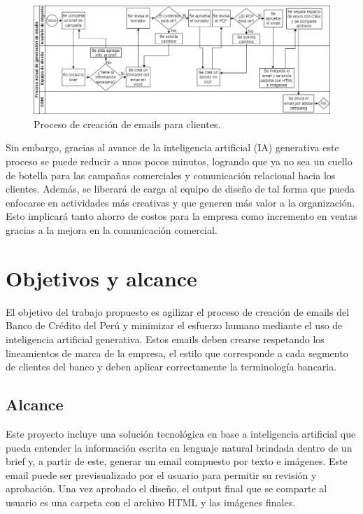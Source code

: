 \begin{figure}[htpb]
\centering 
\includegraphics[width=1\textwidth]{./Figures/Diagrama1_Creacion_Emails.png}
\caption{Proceso de creación de emails para clientes.}
\label{fig:diagBloques}
\end{figure}

Sin embargo, gracias al avance de la inteligencia artificial (IA) generativa este proceso se puede reducir a unos pocos minutos, logrando que ya no sea un cuello de botella para las campañas comerciales y comunicación relacional hacia los clientes. Además, se liberará de carga al equipo de diseño de tal forma que pueda enfocarse en actividades más creativas y que generen más valor a la organización. Esto implicará tanto ahorro de costos para la empresa como incremento en ventas gracias a la mejora en la comunicación comercial.


\section{Objetivos y alcance}

El objetivo del trabajo propuesto es agilizar el proceso de creación de emails del Banco de Crédito del Perú y minimizar el esfuerzo humano mediante el uso de inteligencia artificial generativa. Estos emails deben crearse respetando los lineamientos de marca de la empresa, el estilo que corresponde a cada segmento de clientes del banco y deben aplicar correctamente la terminología bancaria.

\subsection{Alcance}

Este proyecto incluye una solución tecnológica en base a inteligencia artificial que pueda entender la información escrita en lenguaje natural brindada dentro de un brief y, a partir de este, generar un email compuesto por texto e imágenes. Este email puede ser previsualizado por el usuario para permitir su revisión y aprobación. Una vez aprobado el diseño, el output final que se comparte al usuario es una carpeta con el archivo HTML y las imágenes finales.

